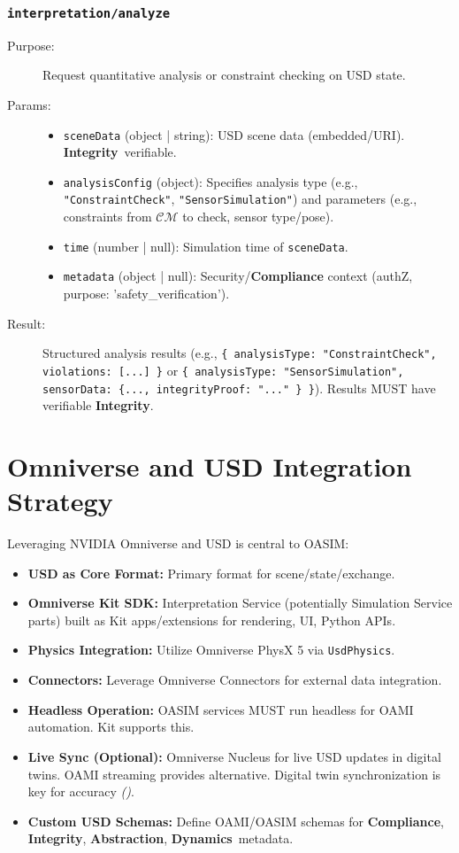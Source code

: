 \documentclass[12pt,a4paper]{report}
\renewcommand{\citep}[1]{\textit{\scriptsize{(\cite{#1})}}}
\newcommand{\Integrity}{\textbf{Integrity}}
\newcommand{\Abstraction}{\textbf{Abstraction}}
\newcommand{\Dynamics}{\textbf{Dynamics}}
\begin{document}
	\subsubsection{\texttt{interpretation/analyze}}
	\label{app:oasim_interp_analyze}
	\begin{description}
		\item[Purpose:] Request quantitative analysis or constraint checking on USD state.
		\item[Params:]
		\begin{itemize} \itemsep0em
			\item \texttt{sceneData} (object | string): USD scene data (embedded/URI). \Integrity\ verifiable.
			\item \texttt{analysisConfig} (object): Specifies analysis type (e.g., \texttt{"ConstraintCheck"}, \texttt{"SensorSimulation"}) and parameters (e.g., constraints from $\mathcal{CM}$ to check, sensor type/pose).
			\item \texttt{time} (number | null): Simulation time of \texttt{sceneData}.
			\item \texttt{metadata} (object | null): Security/\textbf{Compliance} context (authZ, purpose: 'safety\_verification').
		\end{itemize}
		\item[Result:] Structured analysis results (e.g., \texttt{\{ analysisType: "ConstraintCheck", violations: [...] \}} or \texttt{\{ analysisType: "SensorSimulation", sensorData: \{..., integrityProof: "..." \} \}}). Results MUST have verifiable \Integrity.
	\end{description}
	
	\section{Omniverse and USD Integration Strategy}
	\label{app:oasim_omniverse_usd}
	
	Leveraging NVIDIA Omniverse and USD is central to OASIM:
	\begin{itemize}
		\item \textbf{USD as Core Format:} Primary format for scene/state/exchange.
		\item \textbf{Omniverse Kit SDK:} Interpretation Service (potentially Simulation Service parts) built as Kit apps/extensions for rendering, UI, Python APIs.
		\item \textbf{Physics Integration:} Utilize Omniverse PhysX 5 via \texttt{UsdPhysics}.
		\item \textbf{Connectors:} Leverage Omniverse Connectors for external data integration.
		\item \textbf{Headless Operation:} OASIM services MUST run headless for OAMI automation. Kit supports this.
		\item \textbf{Live Sync (Optional):} Omniverse Nucleus for live USD updates in digital twins. OAMI streaming provides alternative. Digital twin synchronization is key for accuracy \citep{Berg2025DigitalTwin}.
		\item \textbf{Custom USD Schemas:} Define OAMI/OASIM schemas for \textbf{Compliance}, \Integrity, \Abstraction, \Dynamics\ metadata.
	\end{itemize}
	
\end{document}
